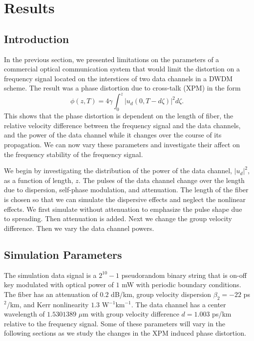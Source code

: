 \chapter{Results}
\label{chap:results}

\section{Introduction}

In the previous section, we presented limitations on the parameters of a commercial optical communication system that would limit the distortion on a frequency signal located on the interstices of two data channels in a DWDM scheme. The result was a phase distortion due to cross-talk (XPM) in the form
%
\begin{equation}
\phi(z,T) = 4\gamma\int_0^z |u_d(0, T-d\zeta)|^2 d\zeta.
\end{equation}
%
This shows that the phase distortion is dependent on the length of fiber, the relative velocity difference between the frequency signal and the data channels, and the power of the data channel while it changes over the course of its propagation. We can now vary these parameters and investigate their affect on the frequency stability of the frequency signal.

We begin by investigating the distribution of the power of the data channel, $|u_d|^2$, as a function of length, $z$. The pulses of the data channel change over the length due to dispersion, self-phase modulation, and attenuation. The length of the fiber is chosen so that we can simulate the dispersive effects and neglect the nonlinear effects. We first simulate without attenuation to emphasize the pulse shape due to spreading. Then attenuation is added. Next we change the group velocity difference. Then we vary the data channel powers.

\section{Simulation Parameters}

The simulation data signal is a $2^{10}-1$ pseudorandom binary string that is on-off key modulated with optical power of $1$ mW with periodic boundary conditions. The fiber has an attenuation of $0.2$ dB/km, group velocity dispersion $\beta_2 = -22$ ps$^2$/km, and Kerr nonlinearity $1.3$ W$^{-1}$km$^{-1}$. The data channel has a center wavelength of $1.5301389$ $\mu$m with group velocity difference $d = 1.003$ ps/km relative to the frequency signal. Some of these parameters will vary in the following sections as we study the changes in the XPM induced phase distortion.

